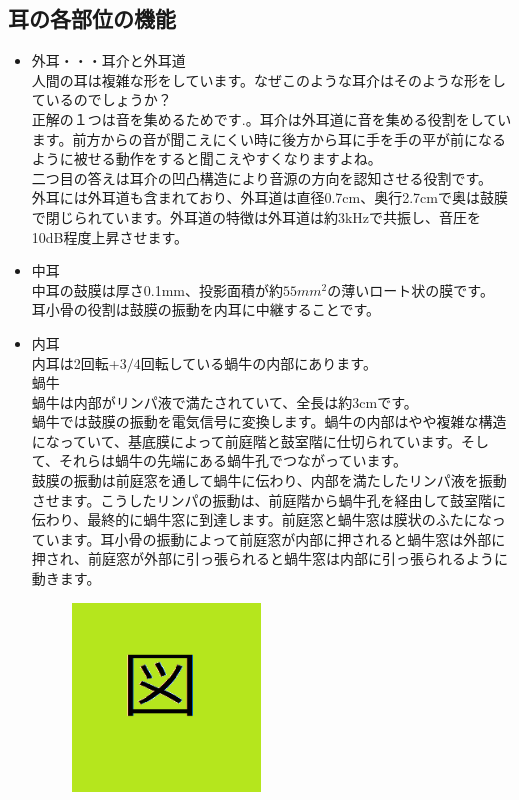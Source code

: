 \documentclass[11pt,b5paper,papersize,dvipdfmx]{jsbook}
\begin{document}
\subsection{耳の各部位の機能}
\begin{itemize} %
  \item 外耳・・・耳介と外耳道\\
  人間の耳は複雑な形をしています。なぜこのような耳介はそのような形をしているのでしょうか？\\
  正解の１つは音を集めるためです.。耳介は外耳道に音を集める役割をしています。前方からの音が聞こえにくい時に後方から耳に手を手の平が前になるように被せる動作をすると聞こえやすくなりますよね。\\
  二つ目の答えは耳介の凹凸構造により音源の方向を認知させる役割です。\\
  外耳には外耳道も含まれており、外耳道は直径0.7cm、奥行2.7cmで奥は鼓膜で閉じられています。外耳道の特徴は外耳道は約3kHzで共振し、音圧を10dB程度上昇させます。
  \item 中耳\\
  中耳の鼓膜は厚さ0.1mm、投影面積が約$55mm^2$の薄いロート状の膜です。\\
  耳小骨の役割は鼓膜の振動を内耳に中継することです。
  \item 内耳\\
  内耳は2回転+$3/4$回転している蝸牛の内部にあります。\\
  蝸牛\\
  蝸牛は内部がリンパ液で満たされていて、全長は約3cmです。\\
  蝸牛では鼓膜の振動を電気信号に変換します。蝸牛の内部はやや複雑な構造になっていて、基底膜によって前庭階と鼓室階に仕切られています。そして、それらは蝸牛の先端にある蝸牛孔でつながっています。\\
  鼓膜の振動は前庭窓を通して蝸牛に伝わり、内部を満たしたリンパ液を振動させます。こうしたリンパの振動は、前庭階から蝸牛孔を経由して鼓室階に伝わり、最終的に蝸牛窓に到達します。前庭窓と蝸牛窓は膜状のふたになっています。耳小骨の振動によって前庭窓が内部に押されると蝸牛窓は外部に押され、前庭窓が外部に引っ張られると蝸牛窓は内部に引っ張られるように動きます。
  \begin{figure}[H]
    \centering
    \includegraphics[width=5cm]{nsmr/img/zu.png}

\end{figure}
\end{itemize}
\end{document}
